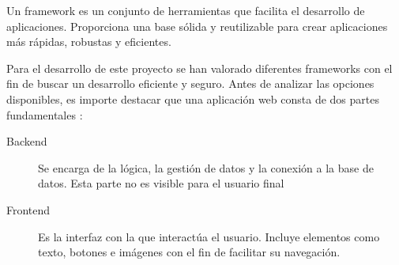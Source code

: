 Un framework es un conjunto de herramientas que facilita el desarrollo de 
aplicaciones. Proporciona una base sólida y reutilizable para crear aplicaciones 
más rápidas, robustas y eficientes.

Para el desarrollo de este proyecto se han valorado diferentes frameworks con el 
fin de buscar un desarrollo eficiente y seguro. Antes de analizar las opciones disponibles, 
es importe destacar que una aplicación web consta de dos partes fundamentales \cite{laboratoria2021}: 

\begin{description}
    \item [Backend] Se encarga de la lógica, la gestión de datos y la conexión a la base de datos. Esta parte no es visible para el usuario final
    \item [Frontend] Es la interfaz con la que interactúa el usuario. Incluye elementos como texto, botones e imágenes con el fin de facilitar su navegación. 
\end{description}
